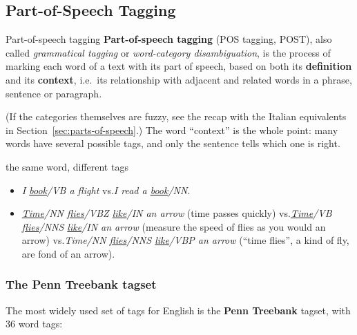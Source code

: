 \subsection{Part-of-Speech Tagging}
\label{sec:pos-tagging}

\begin{nbdef}{Part-of-speech tagging}
\textbf{Part-of-speech tagging} (POS tagging, POST), also called \emph{grammatical
tagging} or \emph{word-category disambiguation}, is the process of marking each word of
a text with its part of speech, based on both its \textbf{definition} and its
\textbf{context}, i.e.\ its relationship with adjacent and related words in a phrase,
sentence or paragraph.
\end{nbdef}

(If the categories themselves are fuzzy, see the recap with the Italian equivalents in
Section~\ref{sec:parts-of-speech}.) The word ``context'' is the whole point: many words have several possible tags, and only
the sentence tells which one is right.

\begin{nbexample}{the same word, different tags}
\begin{itemize}[nosep]
  \item \emph{I \underline{book}/VB a flight} \quad vs.\quad \emph{I read a
        \underline{book}/NN}.
  \item \emph{\underline{Time}/NN \underline{flies}/VBZ \underline{like}/IN an arrow}
        (time passes quickly) \quad vs.\quad \emph{\underline{Time}/VB
        \underline{flies}/NNS \underline{like}/IN an arrow} (measure the speed of flies as
        you would an arrow) \quad vs.\quad \emph{Time/NN \underline{flies}/NNS
        \underline{like}/VBP an arrow} (``time flies'', a kind of fly, are fond of an
        arrow).
\end{itemize}
\end{nbexample}

\subsubsection{The Penn Treebank tagset}

The most widely used set of tags for English is the \textbf{Penn Treebank} tagset, with
36 word tags:

